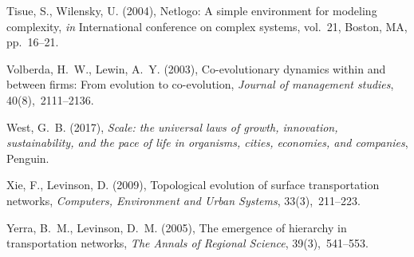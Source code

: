 \documentclass[11pt]{article}
\begin{document}
\begin{thebibliography}{xx}
Tisue, S., Wilensky, U. (2004), Netlogo: A simple environment for modeling
  complexity, {\em in} International conference on complex systems, vol.~21,
  Boston, MA, pp.~16--21.

Volberda, H.~W., Lewin, A.~Y. (2003), Co-evolutionary dynamics within and
  between firms: From evolution to co-evolution, {\em Journal of management
  studies}, 40(8),~2111--2136.

West, G.~B. (2017), {\em Scale: the universal laws of growth, innovation,
  sustainability, and the pace of life in organisms, cities, economies, and
  companies}, Penguin.

Xie, F., Levinson, D. (2009), Topological evolution of surface transportation
  networks, {\em Computers, Environment and Urban Systems}, 33(3),~211--223.

Yerra, B.~M., Levinson, D.~M. (2005), The emergence of hierarchy in
  transportation networks, {\em The Annals of Regional Science},
  39(3),~541--553.

\end{thebibliography}







\end{document}
